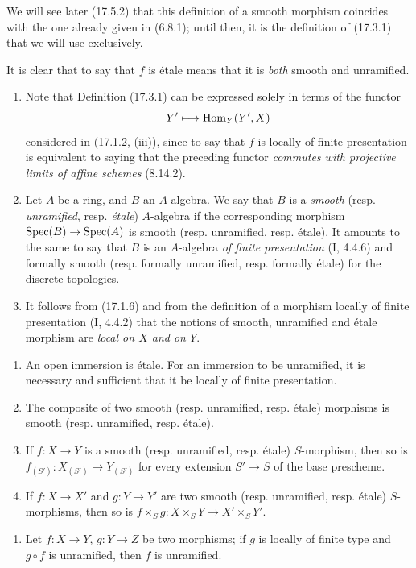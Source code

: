 We will see later (17.5.2) that this definition of a smooth morphism coincides with the one already given in (6.8.1); until then, it is the definition of (17.3.1) that we will use exclusively.

It is clear that to say that $f$ is étale means that it is \emph{both} smooth and unramified.

\begin{remarks}[17.3.2]\label{IV.17.3.2}
\begin{enumerate}
  \item[(i)] Note that Definition (17.3.1) can be expressed solely in terms of the functor
  \[
    Y'\longmapsto\operatorname{Hom}_Y(Y',X)
  \]
  considered in (17.1.2, (iii)), since to say that $f$ is locally of finite presentation is equivalent to saying that the preceding functor \emph{commutes with projective limits of affine schemes} (8.14.2).
  \item[(ii)] Let $A$ be a ring, and $B$ an $A$-algebra. We say that $B$ is a \emph{smooth} (resp. \emph{unramified}, resp. \emph{étale}) $A$-algebra if the corresponding morphism $\operatorname{Spec}(B)\to\operatorname{Spec}(A)$ is smooth (resp. unramified, resp. étale). It amounts to the same to say that $B$ is an $A$-algebra \emph{of finite presentation} (I, 4.4.6) and formally smooth (resp. formally unramified, resp. formally étale) for the discrete topologies.
  \item[(iii)] It follows from (17.1.6) and from the definition of a morphism locally of finite presentation (I, 4.4.2) that the notions of smooth, unramified and étale morphism are \emph{local on $X$ and on $Y$}.
\end{enumerate}
\end{remarks}

\begin{proposition}[17.3.3]
\label{IV.17.3.3}
\begin{enumerate}
  \item[(i)] An open immersion is étale. For an immersion to be unramified, it is necessary and sufficient that it be locally of finite presentation.
  \item[(ii)] The composite of two smooth (resp. unramified, resp. étale) morphisms is smooth (resp. unramified, resp. étale).
  \item[(iii)] If $f:X\to Y$ is a smooth (resp. unramified, resp. étale) $S$-morphism, then so is $f_{(S')}:X_{(S')}\to Y_{(S')}$ for every extension $S'\to S$ of the base prescheme.
  \item[(iv)] If $f:X\to X'$ and $g:Y\to Y'$ are two smooth (resp. unramified, resp. étale) $S$-morphisms, then so is $f\times_S g:X\times_S Y\to X'\times_S Y'$.
\end{enumerate}


\begin{enumerate}
  \item[(v)] Let $f:X\to Y$, $g:Y\to Z$ be two morphisms; if $g$ is locally of finite type and $g\circ f$ is unramified, then $f$ is unramified.
\end{enumerate}
\end{proposition}

